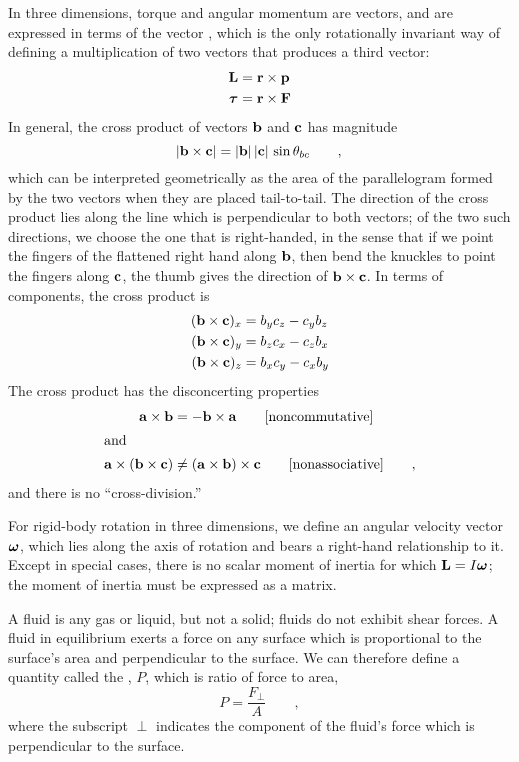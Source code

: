 	In three dimensions, torque and angular momentum are vectors, and are expressed
	in terms of the vector , which is the only
	rotationally invariant way of defining a multiplication of two vectors
	that produces a third vector:
	\begin{align*}
		\mathbf{L}	&= \mathbf{r}\times\mathbf{p}\\
		\boldsymbol{\tau}	&= \mathbf{r}\times\mathbf{F}
	\end{align*}
	In general, the cross product of vectors $\mathbf{b}$ and $\mathbf{c}$ has
	magnitude
	\begin{equation*}
		|\mathbf{b}\times\mathbf{c}|	= |\mathbf{b}|\,|\mathbf{c}|\,\sin\theta_{bc} \qquad ,\\
	\end{equation*}
	which can be interpreted geometrically as the area of the parallelogram
	formed by the two vectors when they are placed tail-to-tail.
	The direction of the cross product lies along the line which is perpendicular
	to both vectors; of the two such directions, we choose the one that is right-handed,
	in the sense that if we point the fingers of the flattened right hand along
	$\mathbf{b}$, then bend the knuckles to point the fingers along $\mathbf{c}$, the thumb
	gives the direction of $\mathbf{b}\times\mathbf{c}$. In terms of components, the
	cross product is
	\begin{align*}
	(\mathbf{b}\times\mathbf{c})_x	&=  b_yc_z - c_yb_z\\
	(\mathbf{b}\times\mathbf{c})_y	&=  b_zc_x - c_zb_x\\
	(\mathbf{b}\times\mathbf{c})_z	&=  b_xc_y - c_xb_y
	\end{align*}
	The  cross product 
	has the disconcerting properties
	\begin{align*}
		\mathbf{a}\times\mathbf{b} &= -\mathbf{b}\times\mathbf{a} \qquad \text{[noncommutative]}\\
		\intertext{and}
		\mathbf{a}\times(\mathbf{b}\times\mathbf{c}) &\ne (\mathbf{a}\times\mathbf{b})\times\mathbf{c} \qquad \text{[nonassociative]} \qquad ,
	\end{align*}
	and there is no ``cross-division.''
	
	For rigid-body rotation in three dimensions, we define an angular velocity
	vector $\boldsymbol{\omega}$, which lies along the axis of rotation and bears a right-hand
	relationship to it. Except in special cases, there is no scalar moment of
	inertia for which $\mathbf{L}=I\boldsymbol{\omega}$; the moment of inertia must be expressed
	as a matrix.
	
	A fluid is any gas or liquid, but not a solid; fluids do not
	exhibit shear forces. A fluid in equilibrium exerts a force
	on any surface which is proportional to the surface's area
	and perpendicular to the surface. We can therefore define a
	quantity called the , $P$, which is ratio of force to area,
	\begin{equation*}
			P =     \frac{F_\perp}{A}\qquad   ,  
	\end{equation*}
	where the subscript $\perp$ indicates the component of the fluid's
	force which is perpendicular to the surface.
	
